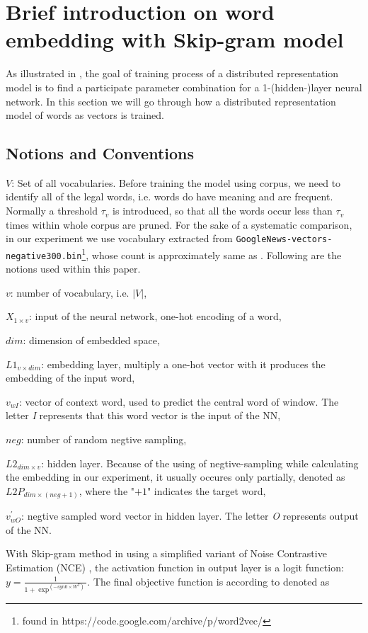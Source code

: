 \section{Brief introduction on word embedding with Skip-gram model}
As illustrated in \cite{mikolov2013distributed}, the goal of training process of a distributed representation model is to find a participate parameter combination for a 1-(hidden-)layer neural network. In this section we will go through how a distributed representation model of words as vectors is trained.

  \subsection{Notions and Conventions}
  $V$: Set of all vocabularies. Before training the model using corpus, we need to identify all of the legal words, i.e. words do have meaning and are frequent. Normally a threshold $\tau_v$ is introduced, so that all the words occur less than $\tau_v$ times within whole corpus are pruned. For the sake of a systematic comparison, in our experiment we use vocabulary extracted from \verb|GoogleNews-vectors-negative300.bin|\footnote{found in https://code.google.com/archive/p/word2vec/}, whose count is approximately same as \cite{levy2015improving}. Following are the notions used within this paper.

  $v$: number of vocabulary, i.e. $|V|$,

  $X_{1 \times v}$: input of the neural network, one-hot encoding of a word,

  $dim$: dimension of embedded space,

  $L1_{v \times dim}$: embedding layer, multiply a one-hot vector with it produces the embedding of the input word,

  $v_{wI}$: vector of context word, used to predict the central word of window. The letter \textit{I} represents that this word vector is the input of the NN,

  $neg$: number of random negtive sampling,

  $L2_{dim \times v}$: hidden layer. Because of the using of negtive-sampling while calculating the embedding in our experiment, it usually occures only partially, denoted as $L2P_{dim \times (neg+1)}$, where the "$+1$" indicates the target word,

  $v^\prime_{wO}$: negtive sampled word vector in hidden layer. The letter \textit{O} represents output of the NN.

  With Skip-gram method in \cite{mikolov2013distributed} using a simplified variant of Noise Contrastive Estimation (NCE) \cite{gutmann2012noise}, the activation function in output layer is a logit function: $y=\frac{1}{1+\exp ^{(-syn0\times W^T)}}$. The final objective function is according to \cite{mikolov2013distributed} denoted as

